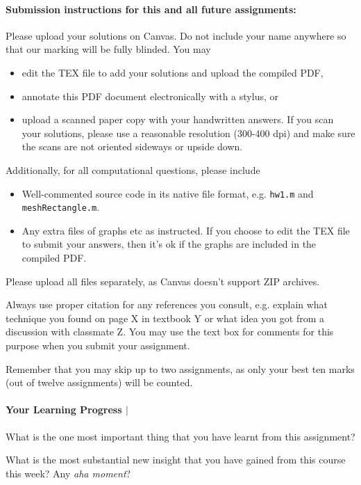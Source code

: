 \documentclass[10pt,letterpaper]{scrartcl}
\begin{document}
\paragraph*{Submission instructions for this and all future assignments:} Please upload your solutions on \textsf{Canvas}. Do not include your name anywhere so that our marking will be fully blinded. You may
\begin{itemize}
\item edit the TEX file to add your solutions and upload the compiled PDF,
\item annotate this PDF document electronically with a stylus, or
\item upload a scanned paper copy with your handwritten answers. If you scan your solutions, please use a reasonable resolution (300-400 dpi) and make sure the scans are not oriented sideways or upside down.
\end{itemize}

Additionally, for all computational questions, please include
\begin{itemize}
\item Well-commented source code in its native file format, e.g. \texttt{hw1.m} and \texttt{meshRectangle.m}.
\item Any extra files of graphs etc as instructed. If you choose to edit the TEX file to submit your answers, then it's ok if the graphs are included in the compiled PDF.
\end{itemize}
Please upload all files separately, as \textsf{Canvas} doesn't support ZIP archives. 

Always use proper citation for any references you consult, e.g. explain what technique you found on page X in textbook Y or what idea you got from a discussion with classmate Z. You may use the text box for comments for this purpose when you submit your assignment.

Remember that you may skip up to two assignments, as only your best ten marks (out of twelve assignments) will be counted.

\paragraph*{Your Learning Progress $\vert$ \faFilePdfO}
What is the one most important thing that you have learnt from this assignment?

\vspace*{3mm}
\hrulefill

\vspace*{3mm}
\hrulefill

\vspace*{3mm}
\hrulefill

What is the most substantial new insight that you have gained from this course this week? Any \emph{aha moment}?

\vspace*{3mm}
\hrulefill

\vspace*{3mm}
\hrulefill

\vspace*{3mm}
\hrulefill
\end{document}
